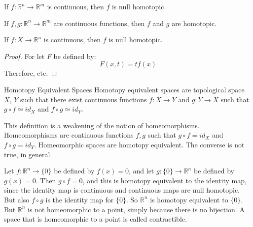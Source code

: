 \documentclass[crop=false,class=book,oneside]{standalone}
\begin{document}
            \begin{theorem}
                If $f:\mathbb{R}^{n}\rightarrow\mathbb{R}^{m}$
                is continuous, then $f$ is null homotopic.
            \end{theorem}
            \begin{theorem}
                If $f,g:\mathbb{R}^{n}\rightarrow\mathbb{R}^{m}$
                are continuous functions, then $f$ and $g$ are
                homotopic.
            \end{theorem}
            \begin{theorem}
                If $f:X\rightarrow\mathbb{R}^{n}$ is continuous,
                then $f$ is null homotopic.
            \end{theorem}
            \begin{proof}
                For let $F$ be defined by:
                \begin{equation}
                    F(x,t)=tf(x)
                \end{equation}
                Therefore, etc.
            \end{proof}
            \begin{ldefinition}{Homotopy Equivalent Spaces}
                Homotopy equivalent spaces are topological
                space $X$, $Y$ such that there exist continuous
                functions $f:X\rightarrow{Y}$ and
                $g:Y\rightarrow{X}$ such that
                $g\circ{f}\simeq{id}_{X}$ and
                $f\circ{g}\simeq{id}_{Y}$.
            \end{ldefinition}
            This definition is a weakening of the notion of
            homeomorphisms. Homeomorphisms are continuous
            functions $f,g$ such that $g\circ{f}=id_{X}$ and
            $f\circ{g}=id_{Y}$. Homeomorphic spaces are homotopy
            equivalent. The converse is not true, in general.
            \begin{lexample}
                Let $f:\mathbb{R}^{n}\rightarrow\{0\}$ be
                defined by $f(x)=0$, and let
                $g:\{0\}\rightarrow\mathbb{R}^{n}$ be defined
                by $g(x)=0$. Then $g\circ{f}=0$, and this
                is homotopy equivalent to the identity map, since
                the identity map is continuous and continuous
                maps are null homotopic. But also
                $f\circ{g}$ is the identity map for
                $\{0\}$. So $\mathbb{R}^{n}$ is homotopy
                equivalent to $\{0\}$. But $\mathbb{R}^{n}$
                is not homeomorphic to a point, simply because
                there is no bijection. A space that is
                homeomorphic to a point is called contractible.
            \end{lexample}
\end{document}
